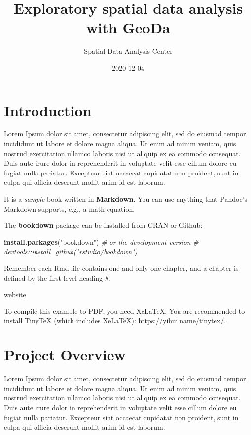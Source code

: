 \documentclass[
]{book}
\title{Exploratory spatial data analysis with GeoDa}
\author{Spatial Data Analysis Center}
\date{2020-12-04}
\newenvironment{Shaded}{\begin{snugshade}}{\end{snugshade}}
\newcommand{\CommentTok}[1]{\textcolor[rgb]{0.56,0.35,0.01}{\textit{#1}}}
\newcommand{\KeywordTok}[1]{\textcolor[rgb]{0.13,0.29,0.53}{\textbf{#1}}}
\newcommand{\NormalTok}[1]{#1}
\newcommand{\StringTok}[1]{\textcolor[rgb]{0.31,0.60,0.02}{#1}}
\begin{document}
\maketitle

{
\setcounter{tocdepth}{1}
\tableofcontents
}
\hypertarget{introduction}{%
\chapter*{Introduction}\label{introduction}}

Lorem Ipsum dolor sit amet, consectetur adipiscing elit, sed do eiusmod tempor incididunt ut labore et dolore magna aliqua. Ut enim ad minim veniam, quis nostrud exercitation ullamco laboris nisi ut aliquip ex ea commodo consequat. Duis aute irure dolor in reprehenderit in voluptate velit esse cillum dolore eu fugiat nulla pariatur. Excepteur sint occaecat cupidatat non proident, sunt in culpa qui officia deserunt mollit anim id est laborum.

It is a \emph{sample} book written in \textbf{Markdown}. You can use anything that Pandoc's Markdown supports, e.g., a math equation.

The \textbf{bookdown} package can be installed from CRAN or Github:

\begin{Shaded}
\begin{Highlighting}[]
\KeywordTok{install.packages}\NormalTok{(}\StringTok{"bookdown"}\NormalTok{)}
\CommentTok{# or the development version}
\CommentTok{# devtools::install_github("rstudio/bookdown")}
\end{Highlighting}
\end{Shaded}

Remember each Rmd file contains one and only one chapter, and a chapter is defined by the first-level heading \texttt{\#}.

\href{https://yihui.name/tinytex/}{website}

To compile this example to PDF, you need XeLaTeX. You are recommended to install TinyTeX (which includes XeLaTeX): \url{https://yihui.name/tinytex/}.

\hypertarget{intro}{%
\chapter{Project Overview}\label{intro}}

Lorem Ipsum dolor sit amet, consectetur adipiscing elit, sed do eiusmod tempor incididunt ut labore et dolore magna aliqua. Ut enim ad minim veniam, quis nostrud exercitation ullamco laboris nisi ut aliquip ex ea commodo consequat. Duis aute irure dolor in reprehenderit in voluptate velit esse cillum dolore eu fugiat nulla pariatur. Excepteur sint occaecat cupidatat non proident, sunt in culpa qui officia deserunt mollit anim id est laborum.
\end{document}
